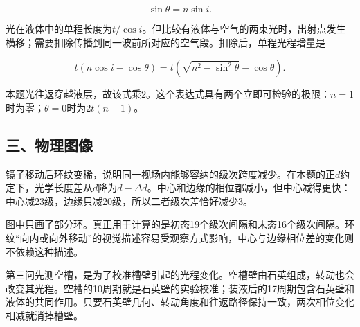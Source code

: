 \documentclass[12pt,a4paper,fontset=fandol]{ctexart}
\begin{document}
\[
\sin\theta=n\sin i.
\]

光在液体中的单程长度为\(t/\cos i\)。但比较有液体与空气的两束光时，出射点发生横移；需要扣除传播到同一波前所对应的空气段。扣除后，单程光程增量是

\[
t(n\cos i-\cos\theta)
=t\left(\sqrt{n^2-\sin^2\theta}-\cos\theta\right).
\]

本题光往返穿越液层，故该式乘2。这个表达式具有两个立即可检验的极限：\(n=1\)时为零；\(\theta=0\)时为\(2t(n-1)\)。

\subsection{三、物理图像}\label{ux4e09ux7269ux7406ux56feux50cf}

镜子移动后环纹变稀，说明同一视场内能够容纳的级次跨度减少。在本题的正\(d\)约定下，光学长度差从\(d\)降为\(d-\Delta d\)。中心和边缘的相位都减小，但中心减得更快：中心减23级，边缘只减20级，所以二者级次差恰好减少3。

\begin{center}
\begin{minipage}{\linewidth}
\centering\begingroup{}
\ifdim\wd\diagrambox>.88\linewidth
\sbox{\diagrambox}{\resizebox{.88\linewidth}{!}{\usebox{\diagrambox}}}\fi
\ifdim\ht\diagrambox>.38\textheight
\resizebox{!}{.38\textheight}{\usebox{\diagrambox}}
\else\usebox{\diagrambox}\fi
\par{}\endgroup\end{minipage}\end{center}

图中只画了部分环。真正用于计算的是初态19个级次间隔和末态16个级次间隔。环纹``向内或向外移动''的视觉描述容易受观察方式影响，中心与边缘相位差的变化则不依赖这种描述。

第三问先测空槽，是为了校准槽壁引起的光程变化。空槽壁由石英组成，转动也会改变其光程。空槽的10周期就是石英壁的实验校准；装液后的17周期包含石英壁和液体的共同作用。只要石英壁几何、转动角度和往返路径保持一致，两次相位变化相减就消掉槽壁。
\end{document}
